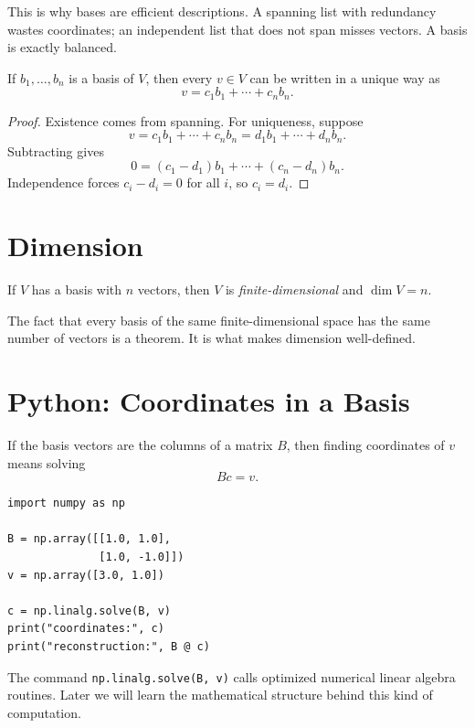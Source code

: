 This is why bases are efficient descriptions. A spanning list with redundancy
wastes coordinates; an independent list that does not span misses vectors. A
basis is exactly balanced.

\begin{theorem}
  If $b_1,\ldots,b_n$ is a basis of $V$, then every $v\in V$ can be written in
  a unique way as
  \[
    v=c_1b_1+\cdots+c_nb_n.
  \]
\end{theorem}

\begin{proof}
  Existence comes from spanning. For uniqueness, suppose
  \[
    v=c_1b_1+\cdots+c_nb_n=d_1b_1+\cdots+d_nb_n.
  \]
  Subtracting gives
  \[
    0=(c_1-d_1)b_1+\cdots+(c_n-d_n)b_n.
  \]
  Independence forces $c_i-d_i=0$ for all $i$, so $c_i=d_i$.
\end{proof}

\section{Dimension}

\begin{definition}
  If $V$ has a basis with $n$ vectors, then $V$ is \emph{finite-dimensional}
  and $\dim V=n$.
\end{definition}

The fact that every basis of the same finite-dimensional space has the same
number of vectors is a theorem. It is what makes dimension well-defined.

\section{Python: Coordinates in a Basis}

If the basis vectors are the columns of a matrix $B$, then finding coordinates
of $v$ means solving
\[
  Bc=v.
\]

\begin{lstlisting}
import numpy as np

B = np.array([[1.0, 1.0],
              [1.0, -1.0]])
v = np.array([3.0, 1.0])

c = np.linalg.solve(B, v)
print("coordinates:", c)
print("reconstruction:", B @ c)
\end{lstlisting}

\begin{computebox}
The command \texttt{np.linalg.solve(B, v)} calls optimized numerical linear
algebra routines. Later we will learn the mathematical structure behind this
kind of computation.
\end{computebox}

